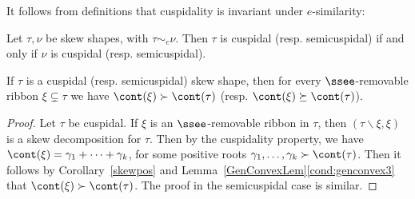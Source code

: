 It follows from definitions that cuspidality is invariant under \(e\)-similarity: 
\begin{lemma}
Let \(\tau, \nu\) be skew shapes, with \(\tau \sim_e \nu\). Then \(\tau\) is cuspidal (resp. semicuspidal) if and only if \(\nu\) is cuspidal (resp. semicuspidal). 
\end{lemma}


\begin{lemma}\label{shapehooktest}
If \(\tau\) is a cuspidal (resp. semicuspidal) skew shape, then for every \(\ssee\)-removable ribbon \(\xi \subsetneq \tau\) we have \(\cont(\xi) \succ \cont(\tau)\) (resp. \(\cont(\xi) \succeq \cont(\tau)\)).
\end{lemma}
\begin{proof}
 Let \(\tau\) be cuspidal. If \(\xi\) is an \(\ssee\)-removable ribbon in \(\tau\), then \((\tau \backslash \xi, \xi)\) is a skew decomposition for \(\tau\). 
 Then by the cuspidality property, we have \(\cont(\xi) = \gamma_1 + \cdots + \gamma_k\), for some positive roots \(\gamma_1, \ldots, \gamma_k \succ \cont(\tau)\). Then it follows by Corollary~\ref{skewpos} and Lemma~\ref{GenConvexLem}\eqref{cond:genconvex3} that \(\cont(\xi) \succ \cont(\tau)\). The proof in the semicuspidal case is similar.
\end{proof}


